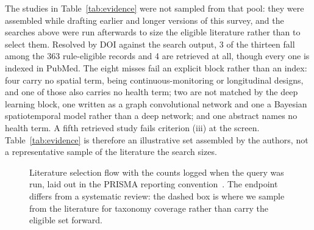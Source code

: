 \documentclass[journal]{IEEEtran}
\providecommand{\Description}[1]{}
\newif\ifsubmission
\begin{document}
The studies in Table~\ref{tab:evidence} were not sampled from that pool: they were assembled while drafting earlier and longer versions of this survey, and the searches above were run afterwards to size the eligible literature rather than to select them. Resolved by DOI against the search output, 3 of the thirteen fall among the 363 rule-eligible records and 4 are retrieved at all, though every one is indexed in PubMed.\ifsubmission\else{} The eight misses fail an explicit block rather than an index: four carry no spatial term, being continuous-monitoring or longitudinal designs, and one of those also carries no health term; two are not matched by the deep learning block, one written as a graph convolutional network and one a Bayesian spatiotemporal model rather than a deep network; and one abstract names no health term. A fifth retrieved study fails criterion (iii) at the screen.\fi{} Table~\ref{tab:evidence} is therefore an illustrative set assembled by the authors, not a representative sample of the literature the search sizes.

\begin{figure}[t]
\centering
\footnotesize
{}
\caption{Literature selection flow with the counts logged when the query was run, laid out in the PRISMA reporting convention~\cite{page2021prisma}. The endpoint differs from a systematic review: the dashed box is where we sample from the literature for taxonomy coverage rather than carry the eligible set forward.}
\Description{A vertical flow diagram of the literature selection process, from sources and query through an unlogged screening stage, eligibility criteria, a quality and saturation gate, to the included studies.}
\label{fig:prisma}
\end{figure}
\end{document}
